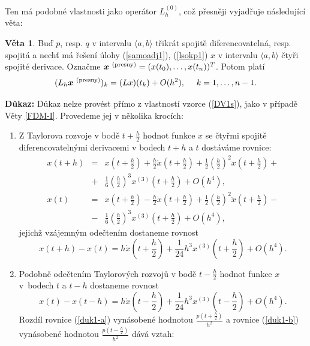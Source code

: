 \documentclass[a4paper, 12pt]{book}
\theoremstyle{definition}
\newtheorem{theorem}{Věta}[section]
\def\vc#1{\mathbf{\boldsymbol{#1}}}     %
\begin{document}
Ten má podobné vlastnosti jako operátor $L_h^{(0)}$, což přesněji vyjadřuje 
následující věta:
\begin{theorem}\label{FDM-II}
Buď $p$, resp. $q$ v intervalu $\langle a,b\rangle$ třikrát spojitě diferencovatelná,
resp. spojitá a nechť má řešení úlohy (\ref{samoadj1}), (\ref{lsokp1}) $x$ 
v intervalu $\langle a,b\rangle$ čtyři spojité derivace. Označme 
$\vc x^{\ \rm(presny)}=(x(t_0),\dots,x(t_n))^T$. Potom platí
\begin{displaymath}
(L_h \vc x^{\ \rm(presny)})_k = (Lx)(t_k)+O(h^2), ~~~~ k=1,\dots,n-1.
\end{displaymath}
\end{theorem}
{\bf Důkaz:}
Důkaz nelze provést přímo z vlastností vzorce (\ref{DV1s}), jako v případě Věty \ref{FDM-I}.
Provedeme jej v několika krocích:
\begin{enumerate}
\item
Z Taylorova rozvoje v bodě $t+\frac h2$ hodnot funkce $x$ se čtyřmi spojitě 
diferencovatelnými derivacemi v bodech $t+h$ a $t$ dostáváme rovnice:
\begin{eqnarray*}
 x(t+h) &=& x(t+\frac h2) + \frac h2 \dot x(t+\frac h2) + \frac 12 \left(\frac h2\right)^2 \ddot x(t+\frac h2) +\\
 &+& \frac 16 \left(\frac h2\right)^3 x^{(3)}(t+\frac h2) + O(h^4),\\
 x(t)   &=& x(t+\frac h2) - \frac h2 \dot x(t+\frac h2) + \frac 12 \left(\frac h2\right)^2 \ddot x(t+\frac h2) -\\
 &-& \frac 16 \left(\frac h2\right)^3 x^{(3)}(t+\frac h2) + O(h^4),
\end{eqnarray*}
jejichž vzájemným odečtením dostaneme rovnost
\begin{equation}\label{duk1-a}
 x(t+h) - x(t) = h \dot x(t+\frac h2) + \frac 1{24} h^3 x^{(3)}(t+\frac h2) + O(h^4).
\end{equation}
\item
Podobně odečtením Taylorových rozvojů v bodě $t-\frac h2$ hodnot funkce $x$ 
v~bodech $t$ a $t-h$ dostaneme rovnost
\begin{equation}\label{duk1-b}
 x(t) - x(t-h) = h \dot x(t-\frac h2) + \frac 1{24} h^3 x^{(3)}(t-\frac h2) + O(h^4).
\end{equation}
Rozdíl rovnice (\ref{duk1-a}) vynásobené hodnotou $\frac{p(t+ \frac h2)}{h^2}$
a rovnice (\ref{duk1-b}) vynásobené hodnotou $\frac{p(t- \frac h2)}{h^2}$ dává
vztah:
\begin{equation}\label{duk1}
\begin{array}{l}

\end{array}
\end{equation}
\end{enumerate}
\end{document}
